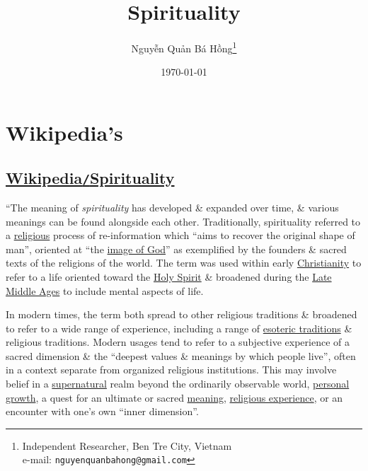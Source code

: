 \documentclass[oneside]{book}
\title{Spirituality}
\author{\selectlanguage{vietnamese} Nguyễn Quản Bá Hồng\footnote{Independent Researcher, Ben Tre City, Vietnam\\e-mail: \texttt{nguyenquanbahong@gmail.com}}}
\date{\today}
\numberwithin{equation}{section}
\begin{document}
\maketitle
\setcounter{secnumdepth}{4}
\setcounter{tocdepth}{4}
\tableofcontents


\chapter{Wikipedia's}

\section{\href{https://en.wikipedia.org/wiki/Spirituality}{Wikipedia\texttt{/}Spirituality}}
``The meaning of \textit{spirituality} has developed \& expanded over time, \& various meanings can be found alongside each other. Traditionally, spirituality referred to a \href{https://en.wikipedia.org/wiki/Religion}{religious} process of re-information which ``aims to recover the original shape of man'', oriented at ``the \href{https://en.wikipedia.org/wiki/Image_of_God}{image of God}'' as exemplified by the founders \& sacred texts of the religions of the world. The term was used within early \href{https://en.wikipedia.org/wiki/Christianity}{Christianity} to refer to a life oriented toward the \href{https://en.wikipedia.org/wiki/Holy_Spirit_(Christianity)}{Holy Spirit} \& broadened during the \href{https://en.wikipedia.org/wiki/Late_Middle_Ages}{Late Middle Ages} to include mental aspects of life.

In modern times, the term both spread to other religious traditions \& broadened to refer to a wide range of experience, including a range of \href{https://en.wikipedia.org/wiki/Western_esotericism}{esoteric traditions} \& religious traditions. Modern usages tend to refer to a subjective experience of a sacred dimension \& the ``deepest values \& meanings by which people live'', often in a context separate from organized religious institutions. This may involve belief in a \href{https://en.wikipedia.org/wiki/Supernatural}{supernatural} realm beyond the ordinarily observable world, \href{https://en.wikipedia.org/wiki/Personal_growth}{personal growth}, a quest for an ultimate or sacred \href{https://en.wikipedia.org/wiki/Meaning_of_life}{meaning}, \href{https://en.wikipedia.org/wiki/Religious_experience}{religious experience}, or an encounter with one's own ``inner dimension''.
\end{document}
